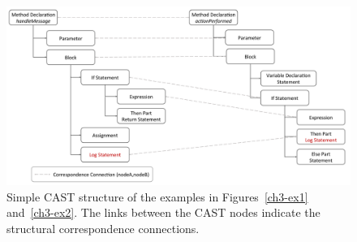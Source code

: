 \begin{figure}

\centering\includegraphics [width = \textwidth, height=0.5\textheight]{Drawing4/FinalCorr.pdf}
  \caption[Simple CAST structure of the examples in Figures~\ref{ch3-ex1} and~\ref{ch3-ex2}.]{Simple CAST structure of the examples in Figures~\ref{ch3-ex1} and~\ref{ch3-ex2}. The links between the CAST nodes indicate the structural correspondence connections.}
  \label{fig:meth-ast-1}
\end{figure}


